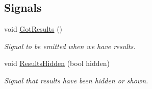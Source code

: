 \subsection*{Signals}
\begin{DoxyCompactItemize}
\item 
void \hyperlink{class_results_view_a53719e5868f7668b0098ac55878116d0}{Got\-Results} ()
\begin{DoxyCompactList}\small\item\em Signal to be emitted when we have results. \end{DoxyCompactList}\item 
void \hyperlink{class_results_view_a6653b210708d25ee8e84c9b2cacbb18a}{Results\-Hidden} (bool hidden)
\begin{DoxyCompactList}\small\item\em Signal that results have been hidden or shown. \end{DoxyCompactList}\end{DoxyCompactItemize}

